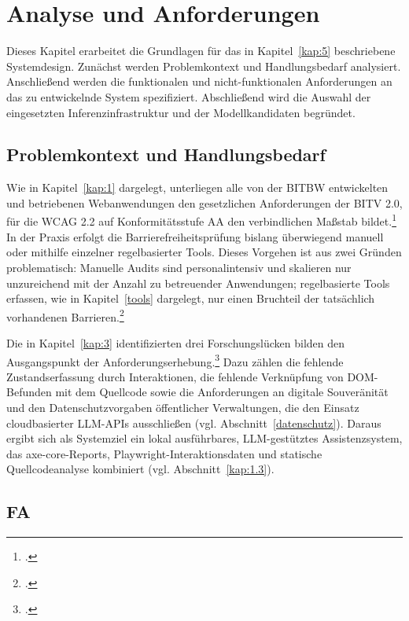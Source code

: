 \chapter{Analyse und Anforderungen}\label{kap:4}

Dieses Kapitel erarbeitet die Grundlagen für das in Kapitel~\ref{kap:5} beschriebene Systemdesign. Zunächst werden Problemkontext und Handlungsbedarf analysiert. Anschließend werden die funktionalen und nicht-funktionalen Anforderungen an das zu entwickelnde System spezifiziert. Abschließend wird die Auswahl der eingesetzten Inferenzinfrastruktur und der Modellkandidaten begründet.

\section{Problemkontext und Handlungsbedarf}\label{kap:4.1}

Wie in Kapitel~\ref{kap:1} dargelegt, unterliegen alle von der \ac{BITBW} entwickelten und betriebenen Web\-anwendungen den gesetzlichen Anforderungen der \ac{BITV} 2.0, für die \ac{WCAG} 2.2 auf Konformitätsstufe AA den verbindlichen Maßstab bildet.\footcites[Vgl.][S. 475]{heinemann_barrierefreiheit_2024}[][]{BITV} In der Praxis erfolgt die Barrierefreiheitsprüfung bislang überwiegend manuell oder mithilfe einzelner regelbasierter Tools. Dieses Vorgehen ist aus zwei Gründen problematisch: Manuelle Audits sind personalintensiv und skalieren nur unzureichend mit der Anzahl zu betreuender Anwendungen; regelbasierte Tools erfassen, wie in Kapitel~\ref{tools} dargelegt, nur einen Bruchteil der tatsächlich vorhandenen Barrieren.\footcite[Vgl.][S. 8--9]{tafreshipour_ma11y_2024}

Die in Kapitel~\ref{kap:3} identifizierten drei Forschungslücken bilden den Ausgangspunkt der Anforderungserhebung.\footcites[Vgl.][S. 9--11, 23--24]{hevnerChatterjeeDesignResearch2010} Dazu zählen die fehlende Zustandserfassung durch Interaktionen, die fehlende Verknüpfung von \ac{DOM}-Befunden mit dem Quellcode sowie die Anforderungen an digitale Souveränität und den Datenschutzvorgaben öffentlicher Verwaltungen, die den Einsatz cloudbasierter \ac{LLM}-\ac{API}s ausschließen (vgl. Abschnitt~\ref{datenschutz}). Daraus ergibt sich als Systemziel ein lokal ausführbares, \ac{LLM}-gestütztes Assistenzsystem, das axe-core-Reports, Playwright-Interaktionsdaten und statische Quellcodeanalyse kombiniert (vgl. Abschnitt~\ref{kap:1.3}).

\section{\acl{FA}} \label{kap:4.2}

